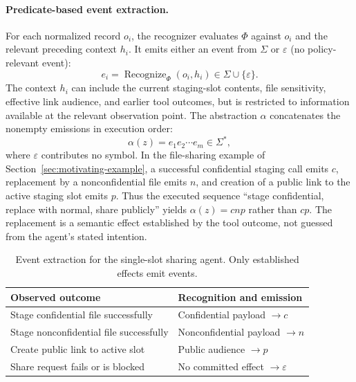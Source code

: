 \paragraph{Predicate-based event extraction.}
For each normalized record $o_i$, the recognizer evaluates $\Phi$ against $o_i$ and the relevant preceding context $h_i$. It emits either an event from $\Sigma$ or $\varepsilon$ (no policy-relevant event):
\[
 e_i=\operatorname{Recognize}_{\Phi}(o_i,h_i)
 \in\Sigma\cup\{\varepsilon\}.
\]
The context $h_i$ can include the current staging-slot contents, file sensitivity, effective link audience, and earlier tool outcomes, but is restricted to information available at the relevant observation point. The abstraction $\alpha$ concatenates the nonempty emissions in execution order:
\[
 \alpha(z)=e_1e_2\cdots e_m\in\Sigma^*,
\]
where $\varepsilon$ contributes no symbol. In the file-sharing example of Section~\ref{sec:motivating-example}, a successful confidential staging call emits $c$, replacement by a nonconfidential file emits $n$, and creation of a public link to the active staging slot emits $p$. Thus the executed sequence ``stage confidential, replace with normal, share publicly'' yields $\alpha(z)=cnp$ rather than $cp$. The replacement is a semantic effect established by the tool outcome, not guessed from the agent's stated intention.

\begin{table}[t]
\caption{Event extraction for the single-slot sharing agent. Only established effects emit events.}
\label{tab:event-extraction}
\centering\small
\begin{tabular}{p{}p{}}
\toprule
Observed outcome & Recognition and emission\\
\midrule
Stage confidential file successfully & Confidential payload $\rightarrow c$\\
Stage nonconfidential file successfully & Nonconfidential payload $\rightarrow n$\\
Create public link to active slot & Public audience $\rightarrow p$\\
Share request fails or is blocked & No committed effect $\rightarrow\varepsilon$\\
\bottomrule
\end{tabular}
\end{table}


